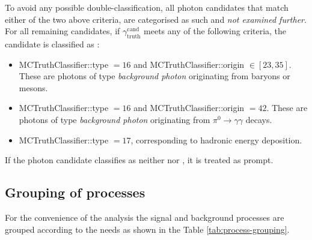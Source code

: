 %
To avoid any possible double-classification, all photon candidates that match either of the two above \efake criteria, are categorised as such and \emph{not examined further}.
For all remaining candidates, if $\gamma_{\mathrm{truth}}^{\mathrm{cand}}$ meets any of the following criteria, the candidate is classified as \hfake:
%
\begin{itemize}
\item MCTruthClassifier::type $= 16$ and MCTruthClassifier::origin $\in [23, 35]$.
These are photons of type \emph{background photon} originating from baryons or mesons.
\item MCTruthClassifier::type $= 16$ and MCTruthClassifier::origin $= 42$. These are photons of type \emph{background photon} originating from $\pi^0 \to \gamma\gamma$ decays.
\item MCTruthClassifier::type $= 17$, corresponding to hadronic energy deposition.
\end{itemize}
%
If the photon candidate classifies as neither \efake nor \hfake, it is treated as prompt.


\subsection{Grouping of processes}

For the convenience of the analysis the signal and background processes are grouped according to the needs as shown in the Table \ref{tab:process-grouping}. 

